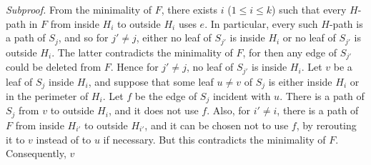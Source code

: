 \textit{Subproof.} From the minimality of $F$, there exists $i$ ($1 \le i \le k$) such that every $H$-path in $F$ from inside $H_i$ to outside $H_i$ uses $e$. In particular, every such $H$-path is a path of $S_j$, and so for $j' \ne j$, either no leaf of $S_{j'}$ is inside $H_i$ or no leaf of $S_{j'}$ is outside $H_i$. The latter contradicts the minimality of $F$, for then any edge of $S_{j'}$ could be deleted from $F$. Hence for $j' \ne j$, no leaf of $S_{j'}$ is inside $H_i$. Let $v$ be a leaf of $S_j$ inside $H_i$, and suppose that some leaf $u \ne v$ of $S_j$ is either inside $H_i$ or in the perimeter of $H_i$. Let $f$ be the edge of $S_j$ incident with $u$. There is a path of $S_j$ from $v$ to outside $H_i$, and it does not use $f$. Also, for $i' \ne i$, there is a path of $F$ from inside $H_{i'}$ to outside $H_{i'}$, and it can be chosen not to use $f$, by rerouting it to $v$ instead of to $u$ if necessary. But this contradicts the minimality of $F$. Consequently, $v$
